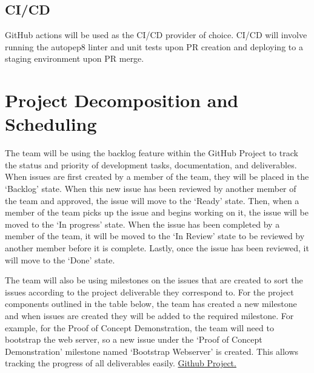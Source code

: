 \documentclass{article}
\begin{document}
\subsection*{CI/CD}
GitHub actions will be used as the CI/CD provider of choice. CI/CD will involve running the autopep8 linter and unit tests upon PR creation and deploying to a staging environment upon PR merge. 

\section{Project Decomposition and Scheduling}

\maketitle

The team will be using the backlog feature within the GitHub Project to track the status and priority of development tasks, documentation, and deliverables. When issues are first created by a member of the team, they will be placed in the ‘Backlog’ state. When this new issue has been reviewed by another member of the team and approved, the issue will move to the ‘Ready’ state. Then, when a member of the team picks up the issue and begins working on it, the issue will be moved to the ‘In progress’ state. When the issue has been completed by a member of the team, it will be moved to the ‘In Review’ state to be reviewed by another member before it is complete. Lastly, once the issue has been reviewed, it will move to the ‘Done’ state. 

The team will also be using milestones on the issues that are created to sort the issues according to the project deliverable they correspond to. For the project components outlined in the table below, the team has created a new milestone and when issues are created they will be added to the required milestone. For example, for the Proof of Concept Demonstration, the team will need to bootstrap the web server, so a new issue under the ‘Proof of Concept Demonstration’ milestone named ‘Bootstrap Webserver’ is created. This allows tracking the progress of all deliverables easily. \href{https://github.com/users/AidanMariglia/projects/1/views/1}{Github Project.} 
\end{document}
